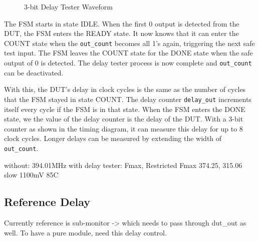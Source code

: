 \begin{figure}[H]
  \centering
  
  \caption{3-bit Delay Tester Waveform}
  \label{DelayTesterWF}
\end{figure}

The FSM starts in state IDLE.
When the first 0 output is detected from the DUT, the FSM enters the READY state.
It now knows that it can enter the COUNT state when the \texttt{out\_count} becomes all 1's again, triggering the next safe test input.
The FSM leaves the COUNT state for the DONE state when the safe output of 0 is detected.
The delay tester process is now complete and \texttt{out\_count} can be deactivated.

With this, the DUT's delay in clock cycles is the same as the number of cycles that the FSM stayed in state COUNT.
The delay counter \texttt{delay\_out} increments itself every cycle if the FSM is in that state.
When the FSM enters the DONE state, we the value of the delay counter is the delay of the DUT.
With a 3-bit counter as shown in the timing diagram, it can measure this delay for up to 8 clock cycles.
Longer delays can be measured by extending the width of \texttt{out\_count}.


without:
394.01MHz
with delay tester:
Fmax, Restricted Fmax
374.25, 315.06
slow 1100mV 85C

\subsection{Reference Delay}
Currently reference is sub-monitor -> which needs to pass through dut\_out as well.
To have a pure module, need this delay control.